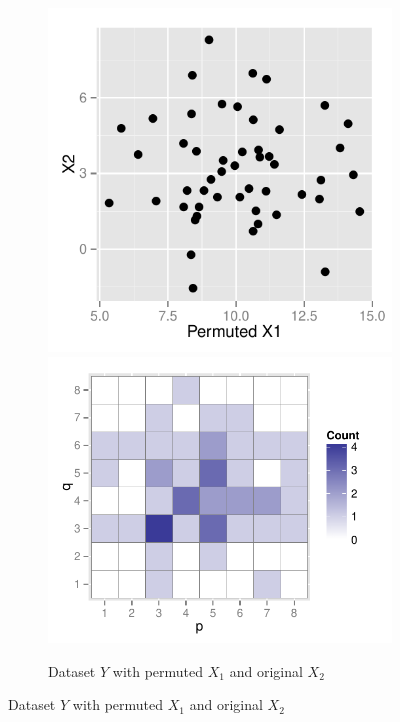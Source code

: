 \documentclass[12pt]{article}\usepackage[]{graphicx}\usepackage[]{color}
\begin{document}
\begin{figure}[!t]
\begin{subfigure}[t]{\textwidth}
\caption{ Dataset $Y$ with permuted $X_1$ and original $X_2$ \label{type_2}}
\includegraphics[scale=0.55]{dat-example-2.pdf}
\includegraphics[scale=0.55]{bin-example-2.pdf}

\end{subfigure}
\end{figure}
\end{document}
